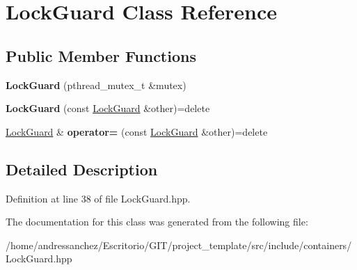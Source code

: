 \hypertarget{classLockGuard}{}\section{Lock\+Guard Class Reference}
\label{classLockGuard}
\subsection*{Public Member Functions}
\begin{DoxyCompactItemize}
\item 
\mbox{\label{classLockGuard_ab02101e6ab27b1a2b078c8cf3b3fca72}} 
{\bfseries Lock\+Guard} (pthread\+\_\+mutex\+\_\+t \&mutex)
\item 
\mbox{\label{classLockGuard_aa3b71de031859e32366fac2cde3ebcaf}} 
{\bfseries Lock\+Guard} (const \hyperlink{classLockGuard}{Lock\+Guard} \&other)=delete
\item 
\mbox{\label{classLockGuard_ad5cbce17e5d6200c16d2ef0d74e772df}} 
\hyperlink{classLockGuard}{Lock\+Guard} \& {\bfseries operator=} (const \hyperlink{classLockGuard}{Lock\+Guard} \&other)=delete
\end{DoxyCompactItemize}


\subsection{Detailed Description}


Definition at line 38 of file Lock\+Guard.\+hpp.



The documentation for this class was generated from the following file\+:\begin{DoxyCompactItemize}
\item 
/home/andressanchez/\+Escritorio/\+G\+I\+T/project\+\_\+template/src/include/containers/Lock\+Guard.\+hpp\end{DoxyCompactItemize}
